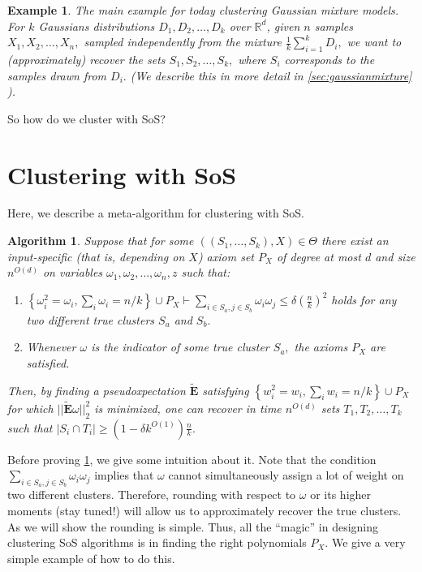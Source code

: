 \documentclass[12pt]{article}%
\newtheorem{algorithm}[theorem]{Algorithm}
\newtheorem{example}[theorem]{Example}
\newcommand{\pseudoexpect}{\tilde{\mathbf{E}}}
\begin{document}
\begin{example}
\normalfont
The main example for today clustering Gaussian mixture models. For $k$ Gaussians distributions $D_1, D_2, \ldots, D_k$ over $\mathbb{R}^d$, given $n$ samples 
$X_1, X_2, \ldots, X_n,$
sampled independently from the mixture 
$\frac{1}{k}\sum_{i = 1}^k D_i,$ we want to (approximately) recover 
the sets $S_1, S_2, \ldots, S_k,$ where $S_i$ corresponds to the samples drawn from $D_i.$ (We describe this in more detail in 
\cref{sec:gaussianmixture}
).
\end{example}

\noindent
So how do we cluster with SoS?

\section{Clustering with SoS}
Here, we describe a meta-algorithm for clustering with SoS. 

\begin{algorithm}
\label{alg:mainmetaalg}
Suppose that for some $((S_1,\ldots,S_k),X) \in \Theta$ there exist an input-specific (that is, depending on $X$) axiom set $P_X$ of degree at most $d$ and size $n^{O(d)}$ on variables $\omega_1, \omega_2, \ldots, \omega_n, z$ such that:
\begin{enumerate}
    \item $\displaystyle\left\{ \omega_i^2 = \omega_i, \sum_i \omega_i = n/k\right\} \cup P_X \vdash \sum_{i \in S_a, j \in S_b} \omega_i \omega_j \le \delta \left(\frac{n}{k}\right)^2$ holds for any two different true clusters $S_a$ and $S_b.$
    \item Whenever $\omega$ is the indicator of some true cluster $S_a,$ the axioms $P_X$ are satisfied.
\end{enumerate}
Then, by finding a pseudoxpectation $\pseudoexpect$ satisfying $\displaystyle\left\{ w_i^2 = w_i, \sum_i w_i = n/k\right\} \cup P_X$ for which $||\pseudoexpect \omega||_2^2$ is minimized, 
one can recover in time $n^{O(d)}$ sets $T_1, T_2, \ldots, T_k$ such that $|S_i \cap T_i|\ge (1- \delta k^{O(1)})\frac{n}{k}.$
\end{algorithm}

\noindent
Before proving \cref{alg:mainmetaalg}, we give some intuition about it. Note that the condition $\sum_{i \in S_a, j \in S_b} \omega_i \omega_j$ implies that $\omega$ cannot simultaneously assign a lot of weight on two different clusters. Therefore, rounding with respect to $\omega$ or its higher moments (stay tuned!) will allow us to approximately recover the true clusters. As we will show the rounding is simple. Thus, all the ``magic'' in designing clustering SoS algorithms is in 
finding the right polynomials $P_X.$ We give a very simple example of how to do this.
\end{document}
